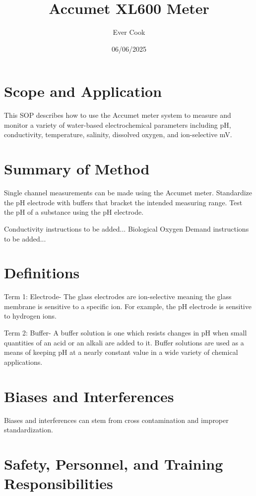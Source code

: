 \documentclass[12pt]{../SOP3}\usepackage[]{graphicx}\usepackage[]{xcolor}
\title{Accumet XL600 Meter}
\date{06/06/2025}
\author{Ever Cook}
\begin{document}
\maketitle

\section{Scope and Application}

\NP This SOP describes how to use the Accumet meter system to measure and monitor a variety of water-based electrochemical parameters including pH, conductivity, temperature, salinity, dissolved oxygen, and ion-selective mV.

\section{Summary of Method}

\NP Single channel measurements can be made using the Accumet meter. Standardize the pH electrode with buffers that bracket the intended measuring range. Test the pH of a substance using the pH electrode.

\NP Conductivity instructions to be added...
\NP Biological Oxygen Demand instructions to be added...

\tableofcontents

\newpage

\section{Definitions}

\NP Term 1: Electrode- The glass electrodes are ion-selective meaning the glass membrane is sensitive to a specific ion. For example, the pH electrode is sensitive to hydrogen ions. 

\NP Term 2: Buffer- A buffer solution is one which resists changes in pH when small quantities of an acid or an alkali are added to it. Buffer solutions are used as a means of keeping pH at a nearly constant value in a wide variety of chemical applications. 

\section{Biases and Interferences}

\NP Biases and interferences can stem from cross contamination and improper standardization.

\section{Safety, Personnel, and Training Responsibilities}
\end{document}
